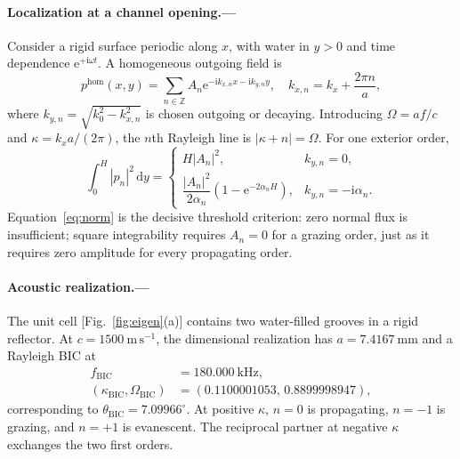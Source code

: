 \documentclass[aps,prl,reprint,superscriptaddress,nofootinbib,floatfix]{revtex4-2}
\newcommand{\ii}{\mathrm{i}}
\newcommand{\e}{\mathrm{e}}
\newcommand{\BIC}{\mathrm{BIC}}
\newcommand{\homg}{\mathrm{hom}}
\begin{document}
\paragraph{Localization at a channel opening.---}
Consider a rigid surface periodic along $x$, with water in $y>0$ and time
dependence $\e^{+\ii\omega t}$.  A homogeneous outgoing field is
\begin{equation}
 p^{\homg}(x,y)=\sum_{n\in\mathbb Z}A_n
 \e^{-\ii k_{x,n}x-\ii k_{y,n}y},\quad
 k_{x,n}=k_x+\frac{2\pi n}{a},
 \label{eq:floquet}
\end{equation}
where $k_{y,n}=\sqrt{k_0^2-k_{x,n}^2}$ is chosen outgoing or decaying.
Introducing $\Omega=af/c$ and $\kappa=k_xa/(2\pi)$, the $n$th Rayleigh line
is $|\kappa+n|=\Omega$.  For one exterior order,
\begin{equation}
 \int_0^H |p_n|^2\,\mathrm{d}y=
 \begin{cases}
 H|A_n|^2, & k_{y,n}=0,\\[2pt]
 \dfrac{|A_n|^2}{2\alpha_n}(1-\e^{-2\alpha_nH}),
 & k_{y,n}=-\ii\alpha_n.
 \end{cases}
 \label{eq:norm}
\end{equation}
Equation~\eqref{eq:norm} is the decisive threshold criterion: zero normal
flux is insufficient; square integrability requires $A_n=0$ for a grazing
order, just as it requires zero amplitude for every propagating order.

\paragraph{Acoustic realization.---}
The unit cell [Fig.~\ref{fig:eigen}(a)] contains two water-filled grooves in a
rigid reflector.  At $c=1500~\mathrm{m\,s^{-1}}$, the dimensional realization
has $a=7.4167~\mathrm{mm}$ and a Rayleigh BIC at
\begin{equation}
 \begin{aligned}
 f_{\BIC}&=180.000~\mathrm{kHz},\\
 (\kappa_{\BIC},\Omega_{\BIC})
 &=(0.1100001053,\,0.8899998947),
 \end{aligned}
 \label{eq:bicpoint}
\end{equation}
corresponding to $\theta_{\BIC}=7.09966^{\circ}$.  At positive $\kappa$,
$n=0$ is propagating, $n=-1$ is grazing, and $n=+1$ is evanescent.  The
reciprocal partner at negative $\kappa$ exchanges the two first orders.
\end{document}
